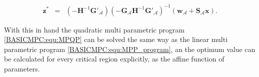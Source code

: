     \begin{equation}
    \begin{array}{rcl}
            \textbf{z}^*&=&(-\textbf{H}^{-1}\textbf{G}'_{\mathcal{A}})(-\textbf{G}_{\mathcal{A}}\textbf{H}^{-1}\textbf{G}'_{\mathcal{A}})^{-1}(\textbf{w}_{\mathcal{A}}+\textbf{S}_{\mathcal{A}}\textbf{x}).
            \end{array}
        \label{BASICMPC:equ:MPQP_optimizer}
    \end{equation}

    With this in hand the quadratic multi parametric program \ref{BASICMPC:equ:MPQP} can be solved the same way as the linear multi parametric program \ref{BASICMPC:equ:MPP_program}, an the optimum value can be calculated for every critical region explicitly, as the affine function of parameters.

